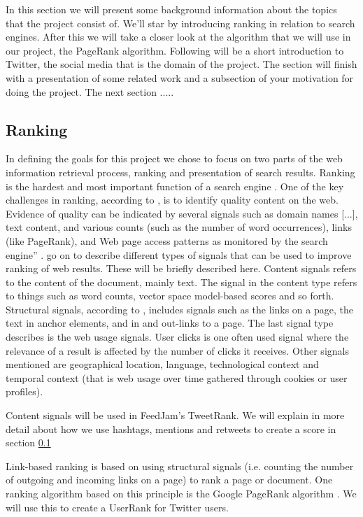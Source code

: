 In this section we will present some background information about the topics that the project consist of. We'll star by introducing ranking in relation to search engines. After this we will take a closer look at the algorithm that we will use in our project, the PageRank algorithm.  Following will be a short introduction to Twitter, the social media that is the domain of the project. The section will finish with a presentation of some related work and a subsection of your motivation for doing the project. The next section .....


\subsection{Ranking} 
In defining the goals for this project we chose to focus on two parts of the web information retrieval process, ranking and presentation of search results. Ranking is the hardest and most important function of a search engine \citep[p.469]{Baeza-Yates2011}. One of the key challenges in ranking, according to \citet{Baeza-Yates2011}, is to identify quality content on the web. Evidence of quality can be indicated by several signals such as domain names [...], text content, and various counts (such as the number of word occurrences), links (like PageRank), and Web page access patterns as monitored by the search engine” \citep[p.468]{Baeza-Yates2011}. 
\citet{Baeza-Yates2011} go on to describe different types of signals that can be used to improve ranking of web results. These will be briefly described here. Content signals refers to the content of the document, mainly text. The signal in the content type refers to things such as word counts, vector space model-based scores and so forth. Structural signals, according to \citet{Baeza-Yates2011}, includes signals such as the links on a page, the text in anchor elements, and in and out-links to a page.  The last signal type describes is the web usage signals. User clicks is one often used signal where the relevance of a result is affected by the number of clicks it receives. Other signals mentioned are geographical location, language, technological context and temporal context (that is web usage over time gathered through cookies or user profiles)\citep{Baeza-Yates2011}.

Content signals will be used in FeedJam's TweetRank. We will explain in more detail about how we use hashtags, mentions and retweets to create a score in section \ref{} \nameref{}

Link-based ranking is based on using structural signals (i.e. counting the number of outgoing and incoming links on a page) to rank a page or document. One ranking algorithm based on this  principle is the Google PageRank algorithm \citep{Page1999}. We will use this to create a UserRank for Twitter users. 

